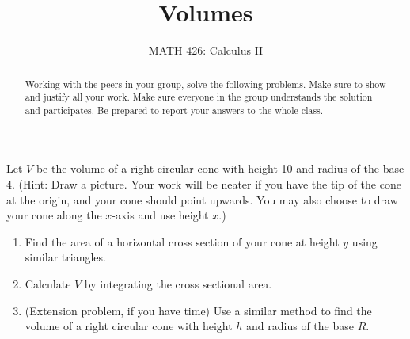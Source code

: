 \documentclass{ximera}
\title{Volumes}
\author{MATH 426: Calculus II}
\begin{document}
\begin{abstract}
   Working with the peers in your group, solve the following problems. Make sure to show and justify all your work. Make sure everyone in the group understands the solution and participates. Be prepared to report your answers to the whole class. 
\end{abstract}
\maketitle



\begin{exercise}
    Let $V$ be the volume of a right circular cone with height 10 and radius of the base 4.  (Hint: Draw a picture.  Your work will be neater if you have the tip of the cone at the origin, and your cone should point upwards.  You may also choose to draw your cone along the $x$-axis and use height $x$.)
    \begin{enumerate}
        \item Find the area of a horizontal cross section of your cone at height $y$ using similar triangles.
        \item Calculate $V$ by integrating the cross sectional area. 
        \item (Extension problem, if you have time) Use a similar method to find the volume of a right circular cone with height $h$ and radius of the base $R$.
    \end{enumerate}
\end{exercise}
\end{document}
